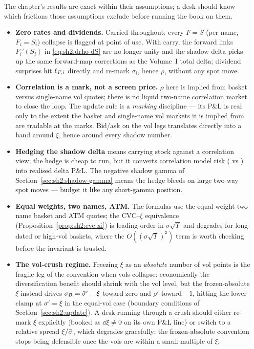 The chapter's results are exact within their assumptions; a desk should
know which frictions those assumptions exclude before running the book on
them.
\begin{itemize}[leftmargin=1.5em]
\item \textbf{Zero rates and dividends.} Carried throughout; every
  $F = S$ (per name, $F_i = S_i$) collapse is flagged at point of use.
  With carry, the forward links $F_i'(S_i)$ in \eqref{eq:sh2:drho-dS} are
  no longer unity and the shadow delta picks up the same forward-map
  corrections as the Volume~I total delta; dividend surprises hit
  $\ell_{F,i}$ directly and re-mark $\sigma_i$, hence $\rho$, without any
  spot move.
\item \textbf{Correlation is a mark, not a screen price.} $\rho$ here is
  implied from basket versus single-name vol quotes; there is no liquid
  two-name correlation market to close the loop. The update rule is a
  \emph{marking} discipline --- its P\&L is real only to the extent the
  basket and single-name vol markets it is implied from are tradable at
  the marks. Bid/ask on the vol legs translates directly into a band
  around $\xi$, hence around every shadow number.
\item \textbf{Hedging the shadow delta} means carrying stock against a
  correlation view; the hedge is cheap to run, but it converts correlation
  model risk (\stickyrho{} vs \stickycvc{}) into realised delta P\&L. The
  negative shadow gamma of Section~\ref{sec:sh2:shadow-gamma} means the
  hedge bleeds on large two-way spot moves --- budget it like any
  short-gamma position.
\item \textbf{Equal weights, two names, ATM.} The formulas use the
  equal-weight two-name basket and ATM quotes; the CVC--$\xi$ equivalence
  (Proposition~\ref{prop:sh2:cvc-xi}) is leading-order in
  $\sigma\sqrt{T}$ and degrades for long-dated or high-vol baskets, where
  the $O((\sigma\sqrt{T})^3)$ term is worth checking before the invariant
  is trusted.
\item \textbf{The vol-crush regime.} Freezing $\xi$ as an \emph{absolute}
  number of vol points is the fragile leg of the convention when vols
  collapse: economically the diversification benefit should shrink with
  the vol level, but the frozen-absolute $\xi$ instead drives
  $\sigma_B = \bar\sigma' - \xi$ toward zero and $\rho'$ toward $-1$, hitting the
  lower clamp at $\sigma' = \xi$ in the equal-vol case (boundary
  conditions of Section~\ref{sec:sh2:update}). A desk running
  \stickycvc{} through a crush should either re-mark $\xi$ explicitly
  (booked as $\dd\xi \neq 0$ on its own P\&L line) or switch to a
  relative spread $\xi/\bar\sigma$, which degrades gracefully; the
  frozen-absolute convention stops being defensible once the vols are
  within a small multiple of $\xi$.
\end{itemize}

